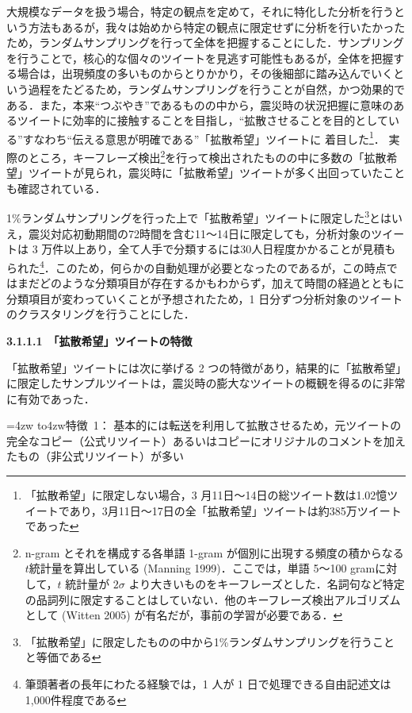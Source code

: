 \documentclass[japanese]{jnlp_1.4}
\begin{document}
大規模なデータを扱う場合，特定の観点を定めて，それに特化した分析を行うという方法もあるが，我々は始めから特定の観点に限定せずに分析を行いたかったため，ランダムサンプリングを行って全体を把握することにした．サンプリングを行うことで，核心的な個々のツイートを見逃す可能性もあるが，全体を把握する場合は，出現頻度の多いものからとりかかり，その後細部に踏み込んでいくという過程をたどるため，ランダムサンプリングを行うことが自然，かつ効果的である．また，本来“つぶやき”であるものの中から，震災時の状況把握に意味のあるツイートに効率的に接触することを目指し，“拡散させることを目的としている”すなわち“伝える意思が明確である”「拡散希望」ツイートに
着目した\footnote{「拡散希望」に限定しない場合，3 月11日〜14日の総ツイート数は1.02憶ツイートであり，3月11日〜17日の全「拡散希望」ツイートは約385万ツイートであった}．
実際のところ，キーフレーズ検出\footnote{n-gram とそれを構成する各単語 1-gram が個別に出現する頻度の積からなる$t$統計量を算出している (Manning 1999)．ここでは，単語 5〜100 gramに対して，$t$ 統計量が $2\sigma$ より大きいものをキーフレーズとした．名詞句など特定の品詞列に限定することはしていない．他のキーフレーズ検出アルゴリズムとして (Witten 2005) が有名だが，事前の学習が必要である．}を行って検出されたものの中に多数の「拡散希望」ツイートが見られ，震災時に「拡散希望」ツイートが多く出回っていたことも確認されている．

1\%ランダムサンプリングを行った上で「拡散希望」ツイートに限定した\footnote{ 
「拡散希望」に限定したものの中から1\%ランダムサンプリングを行うことと等価である}とはいえ，震災対応初動期間の72時間を含む11〜14日に限定しても，分析対象のツイートは 3 万件以上あり，全て人手で分類するには30人日程度かかることが見積もられた\footnote{ 
筆頭著者の長年にわたる経験では，1 人が 1 日で処理できる自由記述文は1,000件程度である}．このため，何らかの自動処理が必要となったのであるが，この時点ではまだどのような分類項目が存在するかもわからず，加えて時間の経過とともに分類項目が変わっていくことが予想されたため，1 日分ずつ分析対象のツイートのクラスタリングを行うことにした．


\noindent\textbf{3.1.1.1　「拡散希望」ツイートの特徴}

「拡散希望」ツイートには次に挙げる 2 つの特徴があり，結果的に「拡散希望」に限定したサンプルツイートは，震災時の膨大なツイートの概観を得るのに非常に有効であった．

\hangindent=4zw\noindent
\hbox to4zw{特徴~1：\hss}
基本的には転送を利用して拡散させるため，元ツイートの完全なコピー（公式リツイート）あるいはコピーにオリジナルのコメントを加えたもの（非公式リツイート）が多い
\end{document}
